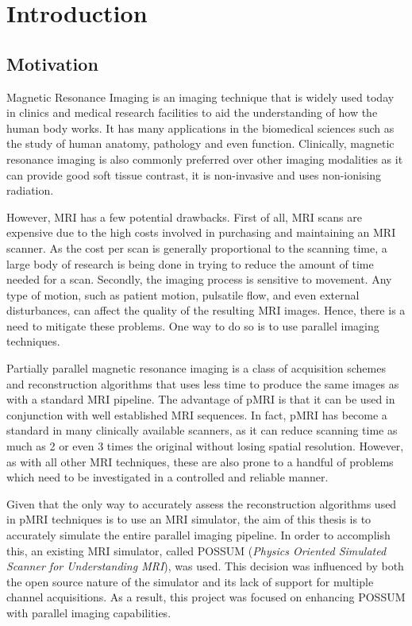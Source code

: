 \chapter{Introduction}
\label{chapterlabel1}

\section{Motivation}

Magnetic Resonance Imaging is an imaging technique that is widely used today in clinics and medical  research facilities to aid the understanding of how the human body works. It has many applications in the biomedical sciences such as the study of human anatomy, pathology and even function. Clinically, magnetic resonance imaging is also commonly preferred over other imaging modalities as it can provide good soft tissue contrast, it is non-invasive and uses non-ionising radiation.

However, MRI has a few potential drawbacks. First of all, MRI scans are expensive due to the high costs involved in purchasing and maintaining an MRI scanner. As the cost per scan is generally proportional to the scanning time, a large body of research is being done in trying to reduce the amount of time needed for a scan. Secondly, the imaging process is sensitive to movement. Any type of motion, such as patient motion, pulsatile flow, and even external disturbances, can affect the quality of the resulting MRI images. Hence, there is a need to mitigate these problems. One way to do so is to use parallel imaging techniques. 

Partially parallel magnetic resonance imaging is a class of acquisition schemes and reconstruction algorithms that uses less time to produce the same images as with a standard MRI pipeline. The advantage of pMRI is that it can be used in conjunction with well established MRI sequences. In fact, pMRI has become a standard in many clinically available scanners, as it can reduce scanning time as much as 2 or even 3 times the original without losing spatial resolution. However, as with all other MRI techniques, these are also prone to a handful of problems which need to be investigated in a controlled and reliable manner. 

Given that the only way to accurately assess the reconstruction algorithms used in pMRI techniques is to use an MRI simulator, the aim of this thesis is to accurately simulate the entire parallel imaging pipeline. In order to accomplish this, an existing MRI simulator, called POSSUM (\textit{Physics Oriented Simulated Scanner for Understanding MRI}), was used. This decision was influenced by both the open source nature of the simulator and its lack of support for multiple channel acquisitions. As a result, this project was focused on enhancing POSSUM with parallel imaging capabilities.

